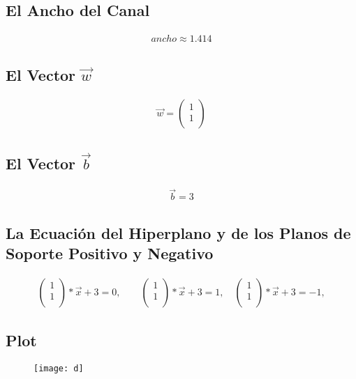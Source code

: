 \documentclass[fleqn]{llncs}
\begin{document}
\subsection{El Ancho del Canal}
\begin{align*}
	ancho \approx 1.414
\end{align*}

\subsection{El Vector $\overrightarrow{w}$}
\begin{align*}
	\overrightarrow{w} =
	\begin{pmatrix}
		1 \\
		1 \\
	\end{pmatrix}
\end{align*}

\subsection{El Vector $\overrightarrow{b}$}
\begin{align*}
	\overrightarrow{b} = 3
\end{align*}

\subsection{La Ecuación del Hiperplano y de los Planos de Soporte Positivo y Negativo}
\begin{align*}
	\begin{pmatrix}
		1 \\
		1 \\
	\end{pmatrix} * \overrightarrow{x} + 3 = 0,
	\qquad
	\begin{pmatrix}
		1 \\
		1 \\
	\end{pmatrix} * \overrightarrow{x} + 3 = 1,
	\quad
	\begin{pmatrix}
		1 \\
		1 \\
	\end{pmatrix} * \overrightarrow{x} + 3 = -1,
\end{align*}

\subsection{Plot}
\begin{figure}[H]
	\centering
	\texttt{[image: d]}
\end{figure}
\end{document}
